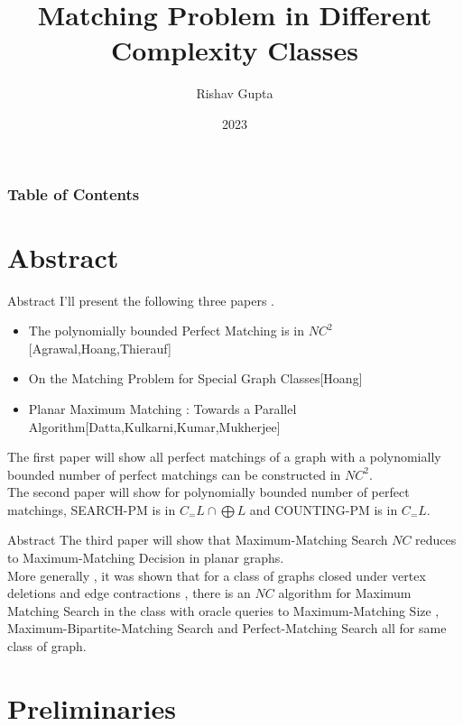 \documentclass{beamer}
\title{Matching Problem in Different Complexity Classes }
\author{Rishav Gupta}
\institute[CMI]{Chennai Mathematical Institute}
\date{2023}
\begin{document}
	\frame{\titlepage}
	\setmainfont{Liberation Serif}
	\begin{frame}
		\frametitle{Table of Contents}
		\tableofcontents
	\end{frame}
	\section{Abstract}
	\begin{frame}{Abstract}
		I'll present the following three papers .
		\begin{itemize}
			\item The polynomially bounded Perfect Matching is in $NC^2$[Agrawal,Hoang,Thierauf] \cite{agrawal07}
			\item On the Matching Problem for Special Graph Classes[Hoang] \cite{htm10}
			\item Planar Maximum Matching : Towards a Parallel Algorithm[Datta,Kulkarni,Kumar,Mukherjee] \cite{datta18}
			
		\end{itemize}
		The first paper will show all perfect matchings of a graph with a polynomially bounded number of perfect matchings can be constructed in $NC^2$.
		\\
		The second paper will show for polynomially bounded number of perfect matchings, SEARCH-PM is in $C_{=}L \cap \bigoplus L $ and COUNTING-PM is in $C_{=}L$.
		
		
	\end{frame}
	\begin{frame}{Abstract}
		The third paper will show that Maximum-Matching Search $NC$ reduces to Maximum-Matching Decision in planar graphs. 
		\\More generally , it was shown that for a class of graphs closed under vertex deletions and edge contractions , there is an $NC$ algorithm for Maximum Matching Search in the class with oracle queries to Maximum-Matching Size , Maximum-Bipartite-Matching Search and Perfect-Matching Search all for same class of graph.
		
	\end{frame}
	\section{Preliminaries}
\end{document}
